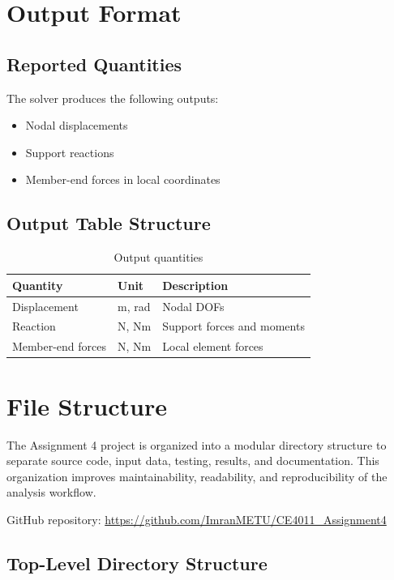 \pagebreak
\section{Output Format}

\subsection{Reported Quantities}

The solver produces the following outputs:

\begin{itemize}
    \item Nodal displacements
    \item Support reactions
    \item Member-end forces in local coordinates
\end{itemize}

\subsection{Output Table Structure}

\begin{table}[H]
    \centering
    \caption{Output quantities}
    \label{tab:output_quantities}
    \begin{tabular}{lll}
        \toprule
        Quantity & Unit & Description \\
        \midrule
        Displacement & m, rad & Nodal DOFs \\
        Reaction & N, Nm & Support forces and moments \\
        Member-end forces & N, Nm & Local element forces \\
        \bottomrule
    \end{tabular}
\end{table}

\pagebreak
\section{File Structure}

The Assignment 4 project is organized into a modular directory structure to
separate source code, input data, testing, results, and documentation. This
organization improves maintainability, readability, and reproducibility of the
analysis workflow.

GitHub repository: \url{https://github.com/ImranMETU/CE4011_Assignment4}

\subsection{Top-Level Directory Structure}

